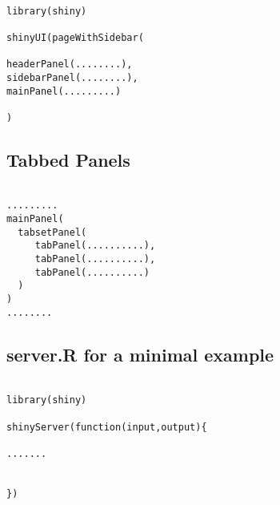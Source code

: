 \documentclass[a4paper,12pt]{article}
\begin{document}

\begin{framed}
\begin{verbatim}

library(shiny)

shinyUI(pageWithSidebar(

headerPanel(........),
sidebarPanel(........),
mainPanel(.........)

)
\end{verbatim}
\end{framed}

\subsection*{Tabbed Panels}
\begin{framed}
\begin{verbatim}

.........
mainPanel(
  tabsetPanel(
     tabPanel(..........),
     tabPanel(..........),
     tabPanel(..........)
  )
)
........
\end{verbatim}
\end{framed}

\newpage
\subsection*{server.R for a minimal example}


\begin{framed}
\begin{verbatim}

library(shiny)

shinyServer(function(input,output){

.......


})
\end{verbatim}
\end{framed}
\end{document}
